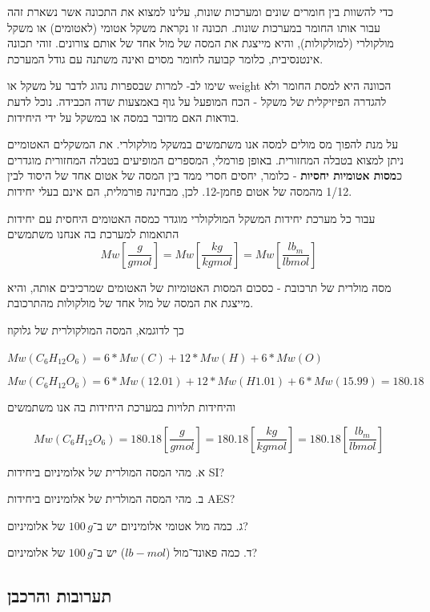 \documentclass[
  hebrew,
  letterpaper,
  DIV=11,
  numbers=noendperiod]{scrreprt}
\begin{document}
{כדי להשוות בין חומרים שונים ומערכות שונות, עלינו למצוא את התכונה אשר
נשארת זהה עבור אותו החומר במערכות שונות\emph{.}} {תכונה זו נקראת משקל
אטומי (לאטומים) או משקל מולקולרי (למולקולות), והיא מייצגת את המסה של מול
אחד של אותם צורונים. זוהי תכונה אינטנסיבית, כלומר קבועה לחומר מסוים
ואינה משתנה עם גודל המערכת.}

{שימו לב- למרות שבספרות נהוג לדבר על משקל או} weight {הכוונה היא למסת
החומר ולא להגדרה הפיזיקלית של משקל - הכח המופעל על גוף באמצעות שדה
הכבידה. נוכל לדעת בודאות האם מדובר במסה או במשקל על ידי היחידות.}

{על מנת להפוך מס\textquotesingle{} מולים למסה אנו משתמשים במשקל
מולקולרי. את המשקלים האטומיים ניתן למצוא בטבלה המחזורית. באופן פורמלי,
המספרים המופיעים בטבלה המחזורית מוגדרים כ\textbf{מסות אטומיות יחסיות} -}
{כלומר, יחסים חסרי ממד בין המסה של אטום אחד של היסוד לבין 1/12 מהמסה של
אטום פחמן-12. לכן, מבחינה פורמלית, הם אינם בעלי יחידות.}

{עבור כל מערכת יחידות המשקל המולקולרי מוגדר כמסה האטומים היחסית עם
יחידות התואמות למערכת בה אנחנו משתמשים}
\[Mw\left\lbrack \frac{g}{gmol} \right\rbrack = Mw\left\lbrack \frac{kg}{kgmol} \right\rbrack = Mw\left\lbrack \frac{lb_{m}}{lbmol} \right\rbrack\]

{מסה מולרית של תרכובת - כסכום המסות האטומיות של האטומים שמרכיבים אותה},
{והיא מייצגת את המסה של מול אחד של מולקולות מהתרכובת.}

{כך לדוגמא, המסה המולקולרית של גלוקוז}

{}\(Mw\left( C_{6}H_{12}O_{6} \right) = 6*Mw(C) + 12*Mw(H) + 6*Mw(O)\)

\[Mw\left( C_{6}H_{12}O_{6} \right) = 6*Mw(12.01) + 12*Mw(H1.01) + 6*Mw(15.99) = 180.18\]

{והיחידות תלויות במערכת היחידות בה אנו משתמשים}

\[Mw\left( C_{6}H_{12}O_{6} \right) = 180.18\left\lbrack \frac{g}{gmol} \right\rbrack = 180.18\left\lbrack \frac{kg}{kgmol} \right\rbrack = 180.18\left\lbrack \frac{lb_{m}}{lbmol} \right\rbrack\]

א. מהי המסה המולרית של אלומיניום ביחידות SI?

ב. מהי המסה המולרית של אלומיניום ביחידות AES?

ג. כמה מול אטומי אלומיניום יש ב־\(100\,g\) של אלומיניום?

ד. כמה פאונד־מול (\(lb\!-\!mol\)) יש ב־\(100\,g\) של אלומיניום?

\subsection{\texorpdfstring{{תערובות
והרכבן}}{תערובות והרכבן}}\label{ux5eaux5e2ux5e8ux5d5ux5d1ux5d5ux5ea-ux5d5ux5d4ux5e8ux5dbux5d1ux5df}
\end{document}
